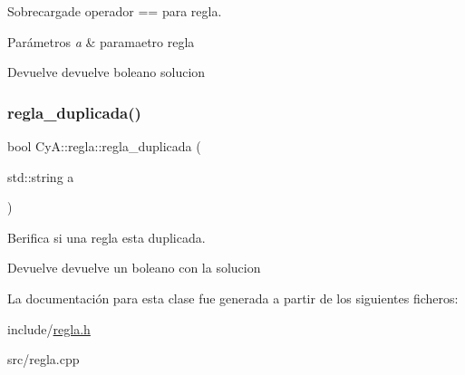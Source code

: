 Sobrecargade operador == para regla. 


\begin{DoxyParams}{Parámetros}
{\em a} & paramaetro regla \\
\hline
\end{DoxyParams}
\begin{DoxyReturn}{Devuelve}
devuelve boleano solucion 
\end{DoxyReturn}
\mbox{\label{class_cy_a_1_1regla_a9084203e31007ef2a0803b26da371e04}} 
\subsubsection{\texorpdfstring{regla\+\_\+duplicada()}{regla\_duplicada()}}
{\footnotesize\ttfamily bool Cy\+A\+::regla\+::regla\+\_\+duplicada (\begin{DoxyParamCaption}\item[{std\+::string}]{a }\end{DoxyParamCaption})}



Berifica si una regla esta duplicada. 

\begin{DoxyReturn}{Devuelve}
devuelve un boleano con la solucion 
\end{DoxyReturn}


La documentación para esta clase fue generada a partir de los siguientes ficheros\+:\begin{DoxyCompactItemize}
\item 
include/\mbox{\hyperlink{regla_8h}{regla.\+h}}\item 
src/regla.\+cpp\end{DoxyCompactItemize}

